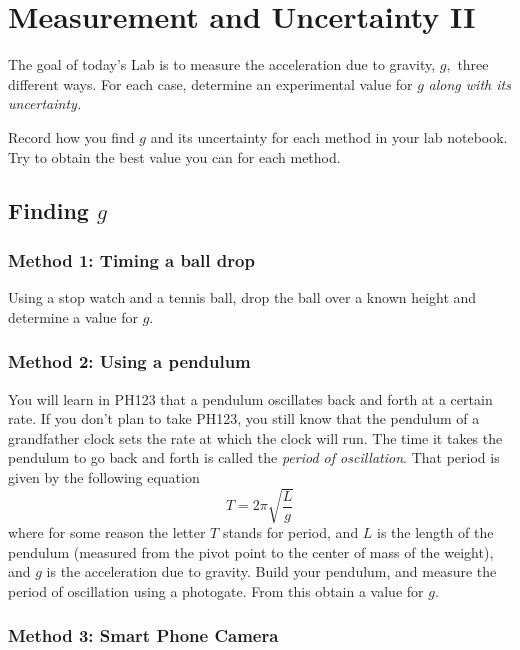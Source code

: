 \documentclass[twoside,11pt,ShortChapTitles]{BYUTextbook}
\begin{document}
\chapter{Measurement and Uncertainty II}

The goal of today's Lab is to measure the acceleration due to gravity, $g,$ three different ways. For each case, determine an experimental value for $g$ {\em along with its uncertainty.}

Record how you find $g$ and its uncertainty for each method in your lab
notebook. Try to obtain the best value you can for each method.
\section{Finding $g$}
\subsection{Method 1: Timing a ball drop}

Using a stop watch and a tennis ball, drop the ball over a known height and
determine a value for $g.$

\subsection{Method 2: Using a pendulum}

You will learn in PH123 that a pendulum oscillates back and forth at a certain
rate. If you don't plan to take PH123, you still know that the pendulum of a
grandfather clock sets the rate at which the clock will run. The time it takes
the pendulum to go back and forth is called the \emph{period of oscillation}.
That period is given by the following equation
\[
T=2\pi\sqrt{\frac{L}{g}}
\]
where for some reason the letter $T$ stands for period, and $L$ is the length
of the pendulum (measured from the pivot point to the center of mass of the weight), and $g$ is the acceleration due to gravity. Build your
pendulum, and measure the period of oscillation using a photogate. From this
obtain a value for $g.$

\subsection{Method 3: Smart Phone Camera}
\end{document}

